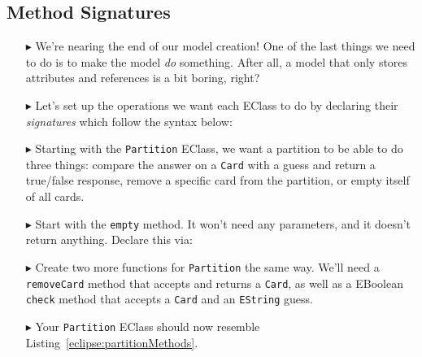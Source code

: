 \newpage
\subsection{Method Signatures}
\texHeader
\hypertarget{static:methods tex}{}

\begin{itemize}

\item[$\blacktriangleright$] We're nearing the end of our model creation! One of the last things we need to do is to make the model \emph{do} something. After
all, a model that only stores attributes and references is a bit boring, right?

\item[$\blacktriangleright$] Let's set up the operations we want each EClass to do by declaring their \emph{signatures} which follow the syntax below:

\item[$\blacktriangleright$] Starting with the \texttt{Partition} EClass, we want a partition to be able to do three things: compare the answer on a
\texttt{Card} with a guess and return a true/false response, remove a specific card from the partition, or empty itself of all cards.

\item[$\blacktriangleright$] Start with the \texttt{empty} method. It won't need any parameters, and it doesn't return anything. Declare this via:

\item[$\blacktriangleright$] Create two more functions for \texttt{Partition} the same way. We'll need a \texttt{removeCard} method that accepts and returns a
\texttt{Card}, as well as a EBoolean \texttt{check} method that accepts a \texttt{Card} and an \texttt{EString} guess. 

\item[$\blacktriangleright$] Your \texttt{Partition} EClass should now resemble Listing~\ref{eclipse:partitionMethods}.

\vspace{0.5cm}

 


\end{itemize}
